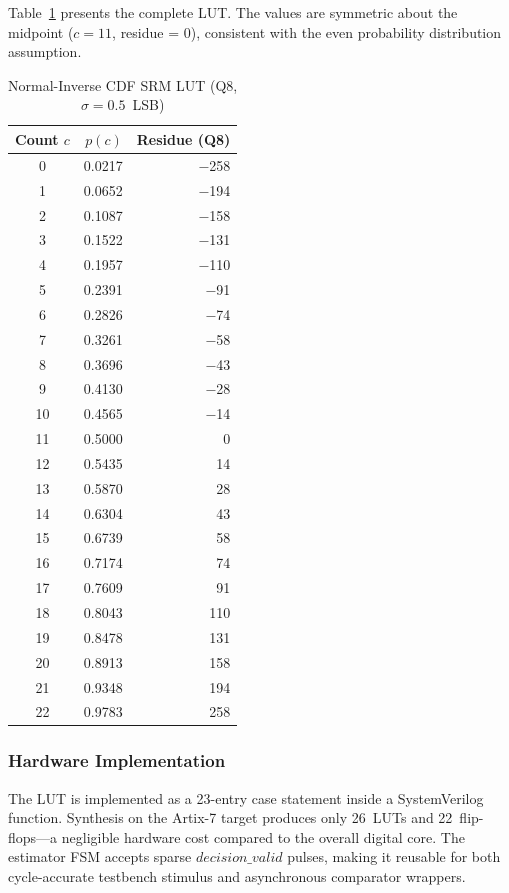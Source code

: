 \documentclass[journal]{IEEEtran}
\begin{document}
Table~\ref{tab:srm_lut} presents the complete LUT. The values are symmetric
about the midpoint ($c = 11$, residue = 0), consistent with the even
probability distribution assumption.

\begin{table}[!t]
\centering
\caption{Normal-Inverse CDF SRM LUT (Q8, $\sigma = 0.5$~LSB)}
\label{tab:srm_lut}
\begin{tabular}{crr}
\toprule
Count $c$ & $p(c)$ & Residue (Q8) \\
\midrule
0 & 0.0217 & $-$258 \\
1 & 0.0652 & $-$194 \\
2 & 0.1087 & $-$158 \\
3 & 0.1522 & $-$131 \\
4 & 0.1957 & $-$110 \\
5 & 0.2391 & $-$91 \\
6 & 0.2826 & $-$74 \\
7 & 0.3261 & $-$58 \\
8 & 0.3696 & $-$43 \\
9 & 0.4130 & $-$28 \\
10 & 0.4565 & $-$14 \\
11 & 0.5000 & 0 \\
12 & 0.5435 & 14 \\
13 & 0.5870 & 28 \\
14 & 0.6304 & 43 \\
15 & 0.6739 & 58 \\
16 & 0.7174 & 74 \\
17 & 0.7609 & 91 \\
18 & 0.8043 & 110 \\
19 & 0.8478 & 131 \\
20 & 0.8913 & 158 \\
21 & 0.9348 & 194 \\
22 & 0.9783 & 258 \\
\bottomrule
\end{tabular}
\end{table}

\subsubsection{Hardware Implementation}

The LUT is implemented as a 23-entry case statement inside a SystemVerilog
function. Synthesis on the Artix-7 target produces only 26~LUTs and 22~flip-
flops---a negligible hardware cost compared to the overall digital core. The
estimator FSM accepts sparse $decision\_valid$ pulses, making it reusable
for both cycle-accurate testbench stimulus and asynchronous comparator
wrappers.
\end{document}
